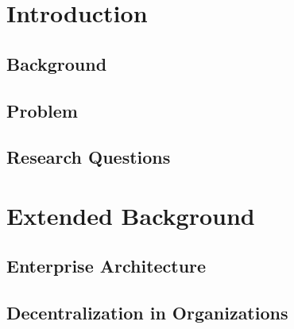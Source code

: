 \documentclass[12pt,
               a4,
               twoside,
               openright]{book} %
\begin{document}
  
    \frontmatterDSV %
    
    \tableofcontents
    
    \chapter{Introduction}
    \label{chap:introduction}
    
    \section{Background}
    \label{sec:background}
    

    \section{Problem}
    \label{sec:problem}    
    
    
    \section{Research Questions}
    \label{sec:resq}
    
    
    
    \chapter{Extended Background}
    \label{chap:extendedBackgrounf}
    
    \section{Enterprise Architecture}
    \label{sec:ea}
    
    
    \section{Decentralization in Organizations}
    \label{sec:organizations}
       
    
%       
    
\end{document}
